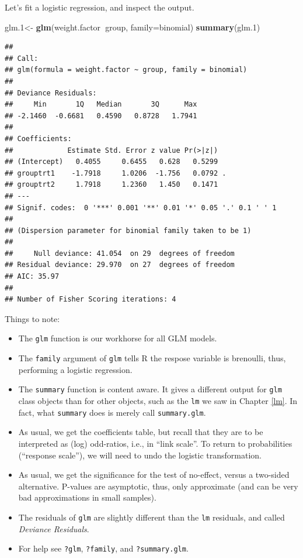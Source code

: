 \documentclass[]{book}
\newenvironment{Shaded}{\begin{snugshade}}{\end{snugshade}}
\newcommand{\DataTypeTok}[1]{\textcolor[rgb]{0.13,0.29,0.53}{#1}}
\newcommand{\FloatTok}[1]{\textcolor[rgb]{0.00,0.00,0.81}{#1}}
\newcommand{\KeywordTok}[1]{\textcolor[rgb]{0.13,0.29,0.53}{\textbf{#1}}}
\newcommand{\NormalTok}[1]{#1}
\newcommand{\OperatorTok}[1]{\textcolor[rgb]{0.81,0.36,0.00}{\textbf{#1}}}
\newcommand{\StringTok}[1]{\textcolor[rgb]{0.31,0.60,0.02}{#1}}
\providecommand{\tightlist}{%
  \setlength{\itemsep}{0pt}\setlength{\parskip}{0pt}}
\theoremstyle{definition}
\theoremstyle{definition}
\theoremstyle{definition}
\theoremstyle{remark}
\begin{document}
Let's fit a logistic regression, and inspect the output.

\begin{Shaded}
\begin{Highlighting}[]
\NormalTok{glm}\FloatTok{.1}\NormalTok{<-}\StringTok{ }\KeywordTok{glm}\NormalTok{(weight.factor}\OperatorTok{~}\NormalTok{group, }\DataTypeTok{family=}\NormalTok{binomial)}
\KeywordTok{summary}\NormalTok{(glm}\FloatTok{.1}\NormalTok{)}
\end{Highlighting}
\end{Shaded}

\begin{verbatim}
## 
## Call:
## glm(formula = weight.factor ~ group, family = binomial)
## 
## Deviance Residuals: 
##     Min       1Q   Median       3Q      Max  
## -2.1460  -0.6681   0.4590   0.8728   1.7941  
## 
## Coefficients:
##             Estimate Std. Error z value Pr(>|z|)  
## (Intercept)   0.4055     0.6455   0.628   0.5299  
## grouptrt1    -1.7918     1.0206  -1.756   0.0792 .
## grouptrt2     1.7918     1.2360   1.450   0.1471  
## ---
## Signif. codes:  0 '***' 0.001 '**' 0.01 '*' 0.05 '.' 0.1 ' ' 1
## 
## (Dispersion parameter for binomial family taken to be 1)
## 
##     Null deviance: 41.054  on 29  degrees of freedom
## Residual deviance: 29.970  on 27  degrees of freedom
## AIC: 35.97
## 
## Number of Fisher Scoring iterations: 4
\end{verbatim}

Things to note:

\begin{itemize}
\tightlist
\item
  The \texttt{glm} function is our workhorse for all GLM models.
\item
  The \texttt{family} argument of \texttt{glm} tells R the respose variable is brenoulli, thus, performing a logistic regression.
\item
  The \texttt{summary} function is content aware. It gives a different output for \texttt{glm} class objects than for other objects, such as the \texttt{lm} we saw in Chapter \ref{lm}. In fact, what \texttt{summary} does is merely call \texttt{summary.glm}.
\item
  As usual, we get the coefficients table, but recall that they are to be interpreted as (log) odd-ratios, i.e., in ``link scale''. To return to probabilities (``response scale''), we will need to undo the logistic transformation.
\item
  As usual, we get the significance for the test of no-effect, versus a two-sided alternative. P-values are asymptotic, thus, only approximate (and can be very bad approximations in small samples).
\item
  The residuals of \texttt{glm} are slightly different than the \texttt{lm} residuals, and called \emph{Deviance Residuals}.
\item
  For help see \texttt{?glm}, \texttt{?family}, and \texttt{?summary.glm}.
\end{itemize}
\end{document}
